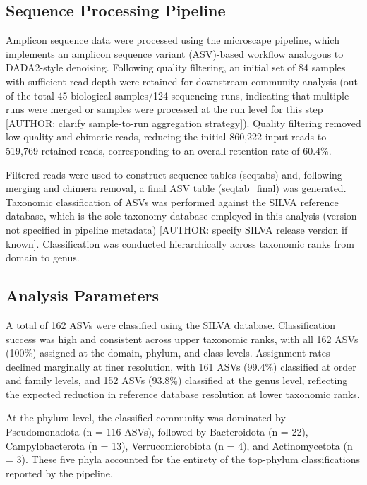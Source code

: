 \documentclass[
  11pt,
]{article}
\begin{document}
\subsection{Sequence Processing
Pipeline}\label{sequence-processing-pipeline}

Amplicon sequence data were processed using the microscape pipeline,
which implements an amplicon sequence variant (ASV)-based workflow
analogous to DADA2-style denoising. Following quality filtering, an
initial set of 84 samples with sufficient read depth were retained for
downstream community analysis (out of the total 45 biological
samples/124 sequencing runs, indicating that multiple runs were merged
or samples were processed at the run level for this step {[}AUTHOR:
clarify sample-to-run aggregation strategy{]}). Quality filtering
removed low-quality and chimeric reads, reducing the initial 860,222
input reads to 519,769 retained reads, corresponding to an overall
retention rate of 60.4\%.

Filtered reads were used to construct sequence tables (seqtabs) and,
following merging and chimera removal, a final ASV table (seqtab\_final)
was generated. Taxonomic classification of ASVs was performed against
the SILVA reference database, which is the sole taxonomy database
employed in this analysis (version not specified in pipeline metadata)
{[}AUTHOR: specify SILVA release version if known{]}. Classification was
conducted hierarchically across taxonomic ranks from domain to genus.

\subsection{Analysis Parameters}\label{analysis-parameters}

A total of 162 ASVs were classified using the SILVA database.
Classification success was high and consistent across upper taxonomic
ranks, with all 162 ASVs (100\%) assigned at the domain, phylum, and
class levels. Assignment rates declined marginally at finer resolution,
with 161 ASVs (99.4\%) classified at order and family levels, and 152
ASVs (93.8\%) classified at the genus level, reflecting the expected
reduction in reference database resolution at lower taxonomic ranks.

At the phylum level, the classified community was dominated by
Pseudomonadota (n = 116 ASVs), followed by Bacteroidota (n = 22),
Campylobacterota (n = 13), Verrucomicrobiota (n = 4), and Actinomycetota
(n = 3). These five phyla accounted for the entirety of the top-phylum
classifications reported by the pipeline.
\end{document}
